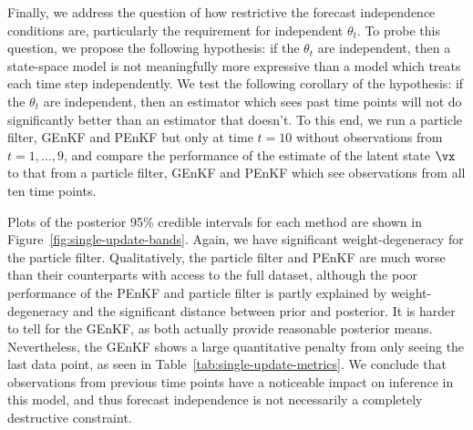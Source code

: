 \documentclass[12pt]{article}
\begin{document}
Finally, we address the question of how restrictive the forecast independence
conditions are, particularly the requirement for independent $\theta_t$. To
probe this question, we propose the following hypothesis: if the $\theta_t$ are
independent, then a state-space model is not meaningfully more expressive than a
model which treats each time step independently. We test the following corollary
of the hypothesis: if the $\theta_t$ are independent, then an estimator which
sees past time points will not do significantly better than an estimator that
doesn't. To this end, we run a particle filter, GEnKF and PEnKF but only at time
$t=10$ without observations from $t=1, \ldots, 9$, and compare the performance
of the estimate of the latent state $\vx$ to that from a particle filter, GEnKF
and PEnKF which see observations from all ten time points.

Plots of the posterior 95\% credible intervals for each method are shown in 
Figure~\ref{fig:single-update-bands}. Again, we have significant
weight-degeneracy for the particle filter. Qualitatively, the particle filter and PEnKF
are much worse than their counterparts with access to the full dataset, although
the poor performance of the PEnKF and particle filter is partly explained by
weight-degeneracy and the significant distance between prior and posterior.  It
is harder to tell for the GEnKF, as both actually provide reasonable posterior
means. Nevertheless, the GEnKF shows a large quantitative penalty from only
seeing the last data point, as seen in Table~\ref{tab:single-update-metrics}. We
conclude that observations from previous time points have a noticeable impact on
inference in this model, and thus forecast independence is not necessarily a
completely destructive constraint.
\end{document}
